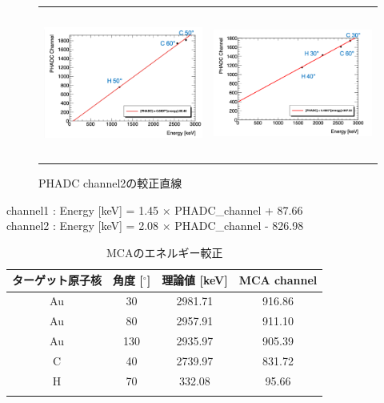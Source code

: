 \documentclass[a4paper,11pt,dvipdfmx]{jsarticle}
\begin{document}
   \begin{figure}[H]
    \begin{tabular}{cc}
      \begin{minipage}[t]{0.47\hsize}
        \centering
        \includegraphics[width=70mm]{picture/cali/calich1.png}
        \caption{PHADC channel1の較正直線}
        \label{ch1line}
      \end{minipage} &
      \begin{minipage}[t]{0.45\hsize}
        \centering
        \includegraphics[width=70mm,height=49mm]{picture/cali/calich2.png}
        \caption{PHADC channel2の較正直線}
        \label{ch2line}
      \end{minipage}
    \end{tabular}
  \end{figure}

\vspace{2mm}

\noindent  
\begin{center}
channel1 : Energy [keV] = 1.45 $\times$ PHADC\_channel + 87.66 \\
channel2 : Energy [keV] = 2.08 $\times$ PHADC\_channel - 826.98
\end{center} 

\begin{table}[t]
\centering
\caption{MCAのエネルギー較正}
\begin{tabular}{cccc} \hline
  ターゲット原子核 & 角度 [$^\circ$] & 理論値 [keV] & MCA channel \\ \hline
  Au & 30 & 2981.71 & 916.86 \\ 
  Au & 80 & 2957.91 & 911.10 \\ 
  Au & 130 & 2935.97 & 905.39 \\ 
  C & 40 & 2739.97 & 831.72 \\ 
  H & 70 & 332.08 & 95.66 \\ \hline
  \label{mcacali}
  \end{tabular}
  \centering
\end{table}
\end{document}
